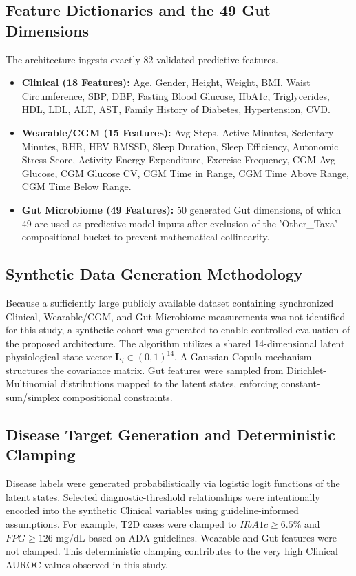 \documentclass[journal, twocolumn]{IEEEtran}
\begin{document}
\subsection{Feature Dictionaries and the 49 Gut Dimensions}
The architecture ingests exactly 82 validated predictive features.
\begin{itemize}
\item \textbf{Clinical (18 Features):} Age, Gender, Height, Weight, BMI, Waist Circumference, SBP, DBP, Fasting Blood Glucose, HbA1c, Triglycerides, HDL, LDL, ALT, AST, Family History of Diabetes, Hypertension, CVD.
\item \textbf{Wearable/CGM (15 Features):} Avg Steps, Active Minutes, Sedentary Minutes, RHR, HRV RMSSD, Sleep Duration, Sleep Efficiency, Autonomic Stress Score, Activity Energy Expenditure, Exercise Frequency, CGM Avg Glucose, CGM Glucose CV, CGM Time in Range, CGM Time Above Range, CGM Time Below Range.
\item \textbf{Gut Microbiome (49 Features):} 50 generated Gut dimensions, of which 49 are used as predictive model inputs after exclusion of the 'Other\_Taxa' compositional bucket to prevent mathematical collinearity.
\end{itemize}

\subsection{Synthetic Data Generation Methodology}
Because a sufficiently large publicly available dataset containing synchronized Clinical, Wearable/CGM, and Gut Microbiome measurements was not identified for this study, a synthetic cohort was generated to enable controlled evaluation of the proposed architecture. The algorithm utilizes a shared 14-dimensional latent physiological state vector $\mathbf{L}_i \in (0, 1)^{14}$. A Gaussian Copula mechanism structures the covariance matrix. Gut features were sampled from Dirichlet-Multinomial distributions mapped to the latent states, enforcing constant-sum/simplex compositional constraints.

\subsection{Disease Target Generation and Deterministic Clamping}
Disease labels were generated probabilistically via logistic logit functions of the latent states. Selected diagnostic-threshold relationships were intentionally encoded into the synthetic Clinical variables using guideline-informed assumptions. For example, T2D cases were clamped to $HbA1c \ge 6.5\%$ and $FPG \ge 126$ mg/dL based on ADA guidelines. Wearable and Gut features were not clamped. This deterministic clamping contributes to the very high Clinical AUROC values observed in this study.
\end{document}
